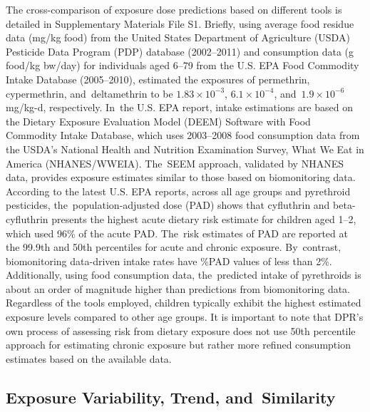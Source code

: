 \documentclass[toxics,article,accept,pdftex,moreauthors]{Definitions/mdpi}
\begin{document}
The cross-comparison of exposure dose predictions based on different
tools is detailed in Supplementary Materials File S1. Briefly, using
average food residue data (mg/kg food) from the United States Department
of Agriculture (USDA) Pesticide Data Program (PDP) database (2002--2011)
and consumption data (g food/kg bw/day) for individuals aged 6--79 from
the U.S. EPA Food Commodity Intake Database (2005--2010),\linebreak
\citet{aylward_screening_level_2018} estimated the exposures of
permethrin, cypermethrin, and~deltamethrin to be
\(1.83 \times 10^{-3}\), \(6.1 \times
10^{-4}\), and~\(1.9 \times 10^{-6}\) mg/kg-d, respectively. In~the U.S.
EPA report, intake estimations are based on the Dietary Exposure
Evaluation Model (DEEM) Software with Food Commodity Intake Database,
which uses 2003--2008 food consumption data from the USDA's National
Health and Nutrition Examination Survey, What We Eat in America
(NHANES/WWEIA). The~SEEM approach, validated by NHANES data, provides
exposure estimates similar to those based on biomonitoring data.
According to the latest U.S. EPA reports, across all age groups and
pyrethroid pesticides, the~population-adjusted dose (PAD) shows that
cyfluthrin and beta-cyfluthrin presents the highest acute dietary risk
estimate for children aged 1--2, which used 96\% of the acute PAD. 
The~risk estimates of PAD are reported at the 99.9th and 50th percentiles
for acute and chronic exposure. By~contrast, biomonitoring data-driven
intake rates have \%PAD values of less than 2\%. Additionally, using
food consumption data, the~predicted intake of pyrethroids is about an
order of magnitude higher than predictions from biomonitoring data.
Regardless of the tools employed, children typically exhibit the highest
estimated exposure levels compared to other age groups. It is important
to note that DPR's own process of assessing risk from dietary exposure
does not use 50th percentile approach for estimating chronic exposure
but rather more refined consumption estimates based on the available
data.

\subsection{Exposure Variability, Trend, and~Similarity}\label{exposure-variability-trend-and-similarity}
\end{document}
